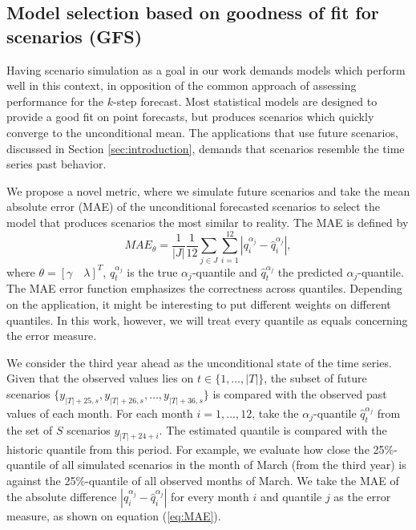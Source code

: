\subsection{Model selection based on goodness of fit for scenarios (GFS)} \label{sec:GFS}

Having scenario simulation as a goal in our work demands models which perform well in this context, in opposition of the common approach of assessing performance for the $k$-step forecast.  Most statistical models are designed to provide a good fit on point forecasts, but produces scenarios which quickly converge to the unconditional mean.
The applications that use future scenarios, discussed in Section \ref{sec:introduction}, demands that scenarios resemble the time series past behavior.

We propose a novel metric, where we simulate future scenarios and take the mean absolute error (MAE) of the unconditional forecasted scenarios to select the model that produces scenarios the most similar to reality.
The MAE is defined by
\begin{equation}
MAE_{\theta}= \frac{1}{|J|} \frac{1}{12} \sum_{j \in J} \sum_{i = 1}^{12}  \left| q_i^{\alpha_{j}}- \hat q_i^{\alpha_{j}}  \right|,
\label{eq:MAE}
\end{equation}
where $\theta = [\gamma \quad \lambda]^T$, $q_t^{\alpha_{j}}$ is the true $\alpha_j$-quantile  and $\hat q_t^{\alpha_j}$ the predicted $\alpha_j$-quantile.
The MAE error function emphasizes the correctness across quantiles. Depending on the application, it might be interesting to put different weights on different quantiles. In this work, however, we will treat every quantile as equals concerning the error measure.

We consider the third year ahead as the unconditional state of the time series. Given that the observed values lies on $t \in \{1,\dots,|T| \}$, the subset of future scenarios $\{y_{|T|+25,s}, y_{|T|+26,s}, \dots, y_{|T|+36,s} \}$ is compared with the observed past values of each month. 
For each month $i = 1,\dots, 12$, take the $\alpha_j$-quantile $\hat q_t^{\alpha_j}$ from the set of $S$ scenarios $y_{|T|+24+i}$. The estimated quantile is compared with the historic quantile from this period. For example, we evaluate how close the 25\%-quantile
of all simulated scenarios in the month of March (from the third year) is against the 25\%-quantile
of all observed months of March. We take the MAE of the absolute difference $\left| q_i^{\alpha_{j}}- \hat q_i^{\alpha_{j}}  \right|$ for every month $i$ and quantile $j$ as the error measure, as shown on equation (\ref{eq:MAE}).

